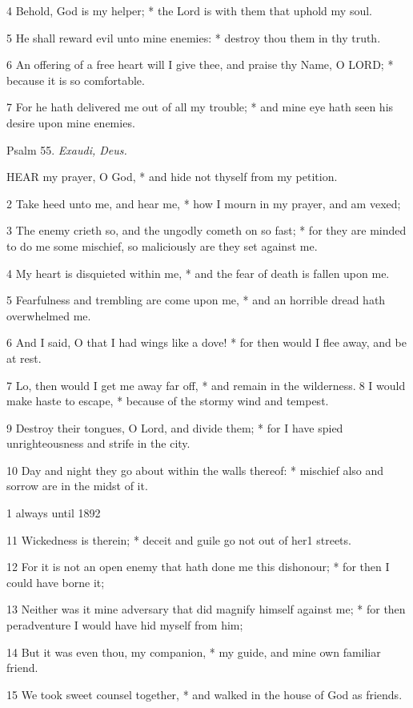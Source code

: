 4 Behold, God is my helper; * the Lord is with them
that uphold my soul.

5 He shall reward evil unto mine enemies: * destroy
thou them in thy truth.

6 An offering of a free heart will I give thee, and
praise thy Name, O LORD; * because it is so comfortable.

7 For he hath delivered me out of all my trouble; *
and mine eye hath seen his desire upon mine enemies.

Psalm
55. \emph{Exaudi, Deus.}

HEAR
my prayer, O God, * and hide not thyself from my petition.

2 Take heed unto me, and hear me, * how I mourn in
my prayer, and am vexed;

3 The enemy crieth so, and the ungodly cometh on so
fast; * for they are minded to do me some mischief, so maliciously are
they set against me.

4 My heart is disquieted within me, * and the fear
of death is fallen upon me.

5 Fearfulness and trembling are come upon me, * and
an horrible dread hath overwhelmed me.

6 And I said, O that I had wings like a dove! * for
then would I flee away, and be at rest.

7 Lo, then would I get me away far off, * and remain
in the wilderness.8 I would make haste to escape, * because of the stormy
wind and tempest.

9 Destroy their tongues, O Lord, and divide them; *
for I have spied unrighteousness and strife in the city.

10 Day and night they go about within the walls thereof:
* mischief also and sorrow are in the midst of it.

1 always until
1892

11 Wickedness is therein; * deceit and guile go not out of her1
streets.

12 For it is not an open enemy that hath done me this
dishonour; * for then I could have borne it;

13 Neither was it mine adversary that did magnify himself
against me; * for then peradventure I would have hid myself from him;

14 But it was even thou, my companion, * my guide, and
mine own familiar friend.

15 We took sweet counsel together, * and walked in the
house of God as friends.

